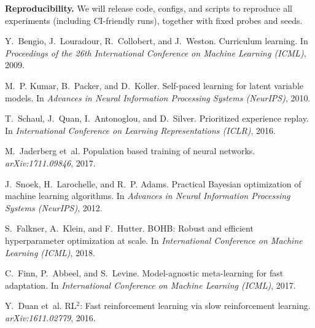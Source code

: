 \documentclass[11pt]{article}
\newcommand{\1}{\mathbf{1}}
\begin{document}
\medskip
\noindent\textbf{Reproducibility.}
We will release code, configs, and scripts to reproduce all experiments (including CI-friendly runs), together with fixed probes and seeds.


\begin{thebibliography}{30}

Y.~Bengio, J.~Louradour, R.~Collobert, and J.~Weston.
\newblock Curriculum learning.
\newblock In \emph{Proceedings of the 26th International Conference on Machine Learning (ICML)}, 2009.

M.~P. Kumar, B.~Packer, and D.~Koller.
\newblock Self-paced learning for latent variable models.
\newblock In \emph{Advances in Neural Information Processing Systems (NeurIPS)}, 2010.

T.~Schaul, J.~Quan, I.~Antonoglou, and D.~Silver.
\newblock Prioritized experience replay.
\newblock In \emph{International Conference on Learning Representations (ICLR)}, 2016.

M.~Jaderberg et~al.
\newblock Population based training of neural networks.
\newblock \emph{arXiv:1711.09846}, 2017.

J.~Snoek, H.~Larochelle, and R.~P. Adams.
\newblock Practical Bayesian optimization of machine learning algorithms.
\newblock In \emph{Advances in Neural Information Processing Systems (NeurIPS)}, 2012.

S.~Falkner, A.~Klein, and F.~Hutter.
\newblock BOHB: Robust and efficient hyperparameter optimization at scale.
\newblock In \emph{International Conference on Machine Learning (ICML)}, 2018.

C.~Finn, P.~Abbeel, and S.~Levine.
\newblock Model-agnostic meta-learning for fast adaptation.
\newblock In \emph{International Conference on Machine Learning (ICML)}, 2017.

Y.~Duan et~al.
\newblock RL$^2$: Fast reinforcement learning via slow reinforcement learning.
\newblock \emph{arXiv:1611.02779}, 2016.


\end{thebibliography}
\end{document}
